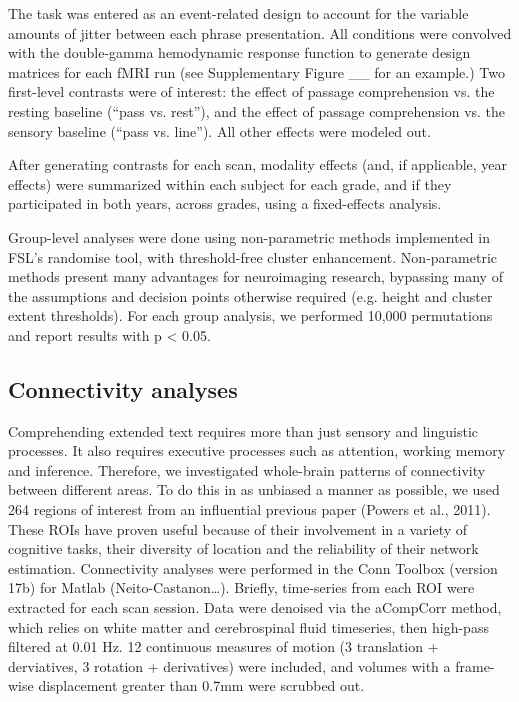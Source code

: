 The task was entered as an event-related design to account for the variable amounts of jitter between each phrase presentation. All conditions were convolved with the double-gamma hemodynamic response function to generate design matrices for each fMRI run (see Supplementary Figure __ for an example.) Two first-level contrasts were of interest: the effect of passage comprehension vs. the resting baseline (“pass vs. rest”), and the effect of passage comprehension vs. the sensory baseline (“pass vs. line”). All other effects were modeled out.

After generating contrasts for each scan, modality effects (and, if applicable, year effects) were summarized within each subject for each grade, and if they participated in both years, across grades, using a fixed-effects analysis. 

Group-level analyses were done using non-parametric methods implemented in FSL’s randomise tool, with threshold-free cluster enhancement. Non-parametric methods present many advantages for neuroimaging research, bypassing many of the assumptions and decision points otherwise required (e.g. height and cluster extent thresholds). For each group analysis, we performed 10,000 permutations and report results with p < 0.05. 

\subsection{Connectivity analyses}

Comprehending extended text requires more than just sensory and linguistic processes. It also requires executive processes such as attention, working memory and inference. Therefore, we investigated whole-brain patterns of connectivity between different areas. To do this in as unbiased a manner as possible, we used 264 regions of interest from an influential previous paper (Powers et al., 2011). These ROIs have proven useful because of their involvement in a variety of cognitive tasks, their diversity of location and the reliability of their network estimation. 
Connectivity analyses were performed in the Conn Toolbox (version 17b) for Matlab (Neito-Castanon…). Briefly, time-series from each ROI were extracted for each scan session. Data were denoised via the aCompCorr method, which relies on white matter and cerebrospinal fluid timeseries, then high-pass filtered at 0.01 Hz. 12 continuous measures of motion (3 translation + derviatives, 3 rotation + derivatives) were included, and volumes with a frame-wise displacement greater than 0.7mm were scrubbed out. 

